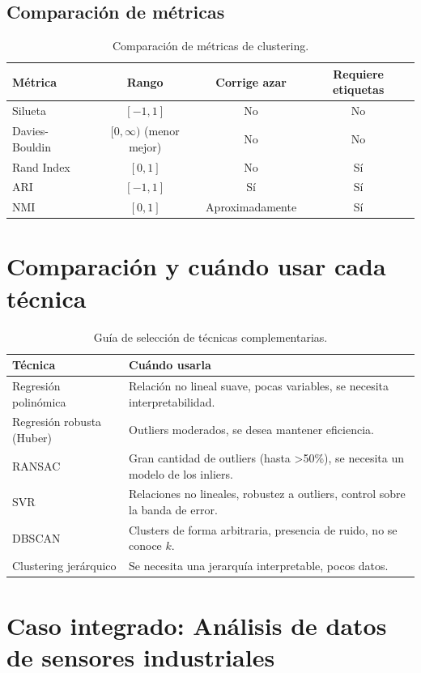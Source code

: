 \documentclass[12pt,a4paper,openany,oneside]{book}
\begin{document}
\subsection{Comparación de métricas}
\begin{table}[h]
\centering
\begin{tabular}{|l|c|c|c|}
\hline
\textbf{Métrica} & \textbf{Rango} & \textbf{Corrige azar} & \textbf{Requiere etiquetas} \\
\hline
Silueta & \([-1,1]\) & No & No \\
Davies-Bouldin & \([0,\infty)\) (menor mejor) & No & No \\
Rand Index & \([0,1]\) & No & Sí \\
ARI & \([-1,1]\) & Sí & Sí \\
NMI & \([0,1]\) & Aproximadamente & Sí \\
\hline
\end{tabular}
\caption{Comparación de métricas de clustering.}
\end{table}

\section{Comparación y cuándo usar cada técnica}

\begin{table}[h]
\centering
\begin{tabular}{|l|l|}
\hline
\textbf{Técnica} & \textbf{Cuándo usarla} \\
\hline
Regresión polinómica & Relación no lineal suave, pocas variables, se necesita interpretabilidad. \\
Regresión robusta (Huber) & Outliers moderados, se desea mantener eficiencia. \\
RANSAC & Gran cantidad de outliers (hasta >50\%), se necesita un modelo de los inliers. \\
SVR & Relaciones no lineales, robustez a outliers, control sobre la banda de error. \\
DBSCAN & Clusters de forma arbitraria, presencia de ruido, no se conoce \(k\). \\
Clustering jerárquico & Se necesita una jerarquía interpretable, pocos datos. \\
\hline
\end{tabular}
\caption{Guía de selección de técnicas complementarias.}
\end{table}

\section{Caso integrado: Análisis de datos de sensores industriales}
\end{document}
